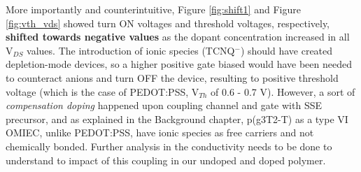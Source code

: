 More importantly and counterintuitive, Figure \ref{fig:shift1} and Figure \ref{fig:vth_vds} showed turn ON voltages and threshold voltages, respectively, \textbf{shifted towards negative values} as the dopant concentration increased in all V$_{DS}$ values. The introduction of ionic species (TCNQ$^{-}$) should have created depletion-mode devices, so a higher positive gate biased would have been needed to counteract anions and turn OFF the device, resulting to positive threshold voltage (which is the case of PEDOT:PSS, V$_{Th}$ of 0.6 - 0.7 V). However, a sort of \textit{compensation doping} happened upon coupling channel and gate with SSE precursor, and as explained in the Background chapter, p(g3T2-T) as a type VI OMIEC, unlike PEDOT:PSS, have ionic species as free carriers and not chemically bonded. Further analysis in the conductivity needs to be done to understand to impact of this coupling in our undoped and doped polymer.

